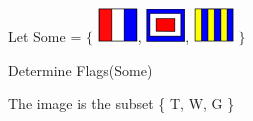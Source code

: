 \documentclass{ximera}
\begin{document}
\begin{exercise}
Let  Some = $\Bigg\{$  {\includegraphics[width=40px,height=34px]{pics/flags/T.png}}, {\includegraphics[width=39px,height=33px]{pics/flags/W.png}}, {\includegraphics[width=40px,height=34px]{pics/flags/G.png}}  $\Bigg\}$

Determine Flags(Some)

  \begin{selectAll}
  \end{selectAll}
  \begin{feedback}
The image is the subset \{ T, W, G  \}
  \end{feedback}
\end{exercise}
\end{document}
